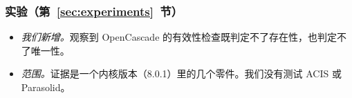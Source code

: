 \subsubsection*{实验（第~\ref{sec:experiments}~节）}
\begin{itemize}
\item \emph{我们新增。}观察到 OpenCascade 的有效性检查既判定不了存在性，也判定不了唯一性。
\item \emph{范围。}证据是一个内核版本（8.0.1）里的几个零件。我们没有测试 ACIS 或 Parasolid。
\end{itemize}
